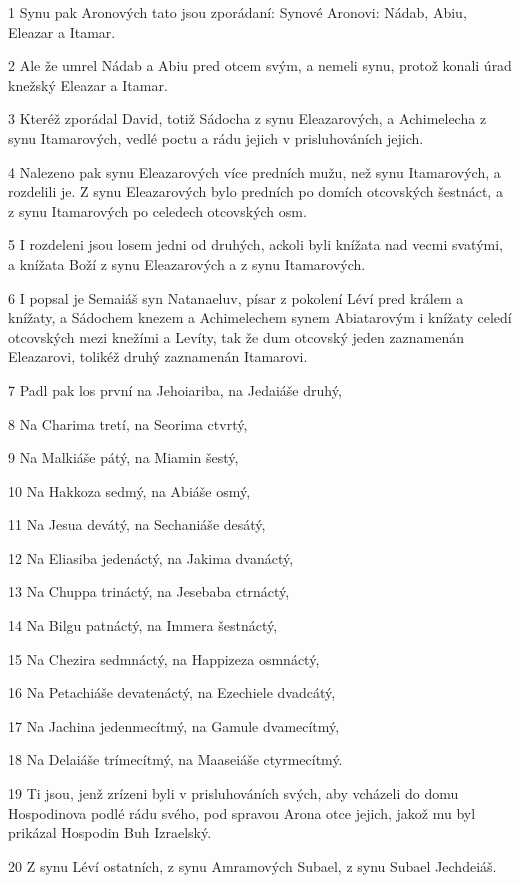 \par 1 Synu pak Aronových tato jsou zporádaní: Synové Aronovi: Nádab, Abiu, Eleazar a Itamar.
\par 2 Ale že umrel Nádab a Abiu pred otcem svým, a nemeli synu, protož konali úrad knežský Eleazar a Itamar.
\par 3 Kteréž zporádal David, totiž Sádocha z synu Eleazarových, a Achimelecha z synu Itamarových, vedlé poctu a rádu jejich v prisluhováních jejich.
\par 4 Nalezeno pak synu Eleazarových více predních mužu, než synu Itamarových, a rozdelili je. Z synu Eleazarových bylo predních po domích otcovských šestnáct, a z synu Itamarových po celedech otcovských osm.
\par 5 I rozdeleni jsou losem jedni od druhých, ackoli byli knížata nad vecmi svatými, a knížata Boží z synu Eleazarových a z synu Itamarových.
\par 6 I popsal je Semaiáš syn Natanaeluv, písar z pokolení Léví pred králem a knížaty, a Sádochem knezem a Achimelechem synem Abiatarovým i knížaty celedí otcovských mezi knežími a Levíty, tak že dum otcovský jeden zaznamenán Eleazarovi, tolikéž druhý zaznamenán Itamarovi.
\par 7 Padl pak los první na Jehoiariba, na Jedaiáše druhý,
\par 8 Na Charima tretí, na Seorima ctvrtý,
\par 9 Na Malkiáše pátý, na Miamin šestý,
\par 10 Na Hakkoza sedmý, na Abiáše osmý,
\par 11 Na Jesua devátý, na Sechaniáše desátý,
\par 12 Na Eliasiba jedenáctý, na Jakima dvanáctý,
\par 13 Na Chuppa trináctý, na Jesebaba ctrnáctý,
\par 14 Na Bilgu patnáctý, na Immera šestnáctý,
\par 15 Na Chezira sedmnáctý, na Happizeza osmnáctý,
\par 16 Na Petachiáše devatenáctý, na Ezechiele dvadcátý,
\par 17 Na Jachina jedenmecítmý, na Gamule dvamecítmý,
\par 18 Na Delaiáše trímecítmý, na Maaseiáše ctyrmecítmý.
\par 19 Ti jsou, jenž zrízeni byli v prisluhováních svých, aby vcházeli do domu Hospodinova podlé rádu svého, pod spravou Arona otce jejich, jakož mu byl prikázal Hospodin Buh Izraelský.
\par 20 Z synu Léví ostatních, z synu Amramových Subael, z synu Subael Jechdeiáš.
